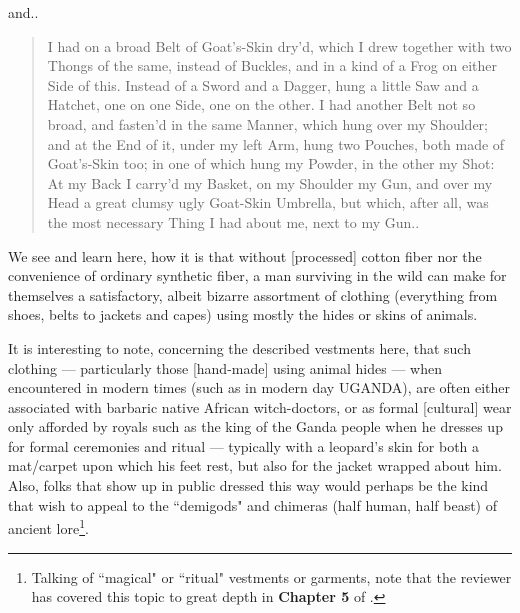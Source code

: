 \documentclass[a4paper]{article}
\begin{document}
and..


\noindent
\begin{minipage}{1\textwidth}
\vspace{1em}
\begin{quotation}
{\ttfamily

I had on a broad Belt of Goat’s-Skin dry’d, which I drew together with two Thongs of the same, instead of Buckles, and in a kind of a Frog on either Side of this. Instead of a Sword and a Dagger, hung a little Saw and a Hatchet, one on one Side, one on the other. I had another Belt not so broad, and fasten’d in the same Manner, which hung over my Shoulder; and at the End of it, under my left Arm, hung two Pouches, both made of Goat’s-Skin too; in one of which hung my Powder, in the other my Shot: At my Back I carry’d my Basket, on my Shoulder my Gun, and over my Head a great clumsy ugly Goat-Skin Umbrella, but which, after all, was the most necessary Thing I had about me, next to my Gun..

}
\end{quotation}
\vspace{1em}
\end{minipage}



We see and learn here, how it is that without [processed] cotton fiber nor the convenience of ordinary synthetic fiber, a man surviving in the wild can make for themselves a satisfactory, albeit bizarre assortment of clothing (everything from shoes, belts to jackets and capes) using mostly the hides or skins of animals. 

It is interesting to note, concerning the described vestments here, that such clothing --- particularly those [hand-made] using animal hides --- when encountered in modern times (such as in modern day UGANDA), are often either associated with barbaric native African witch-doctors, or as formal [cultural] wear only afforded by royals such as the king of the Ganda people when he dresses up for formal ceremonies and ritual --- typically with a leopard's skin for both a mat/carpet upon which his feet rest, but also for the jacket wrapped about him. Also, folks that show up in public dressed this way would perhaps be the kind that wish to appeal to the ``demigods" and chimeras (half human, half beast) of ancient lore\footnote{Talking of ``magical" or ``ritual" vestments or garments, note that the reviewer has covered this topic to great depth in \textbf{Chapter 5} of \cite{lutalo_2025_grimlumtauto}.}.
\end{document}

